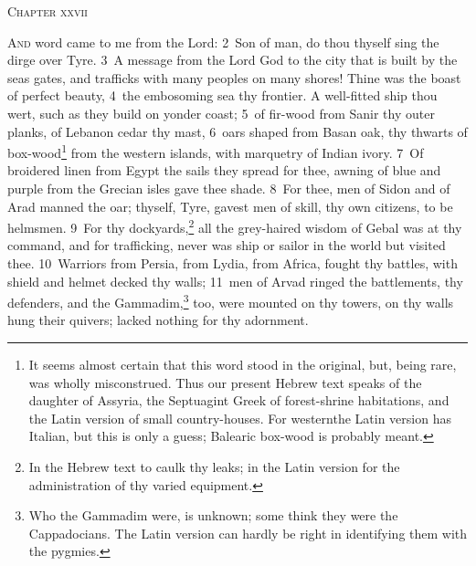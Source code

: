 \documentclass[10pt]{book} %
\begin{document}
\begin{large}\begin{center}\textsc{Chapter xxvii}\end{center}\end{large}
\lettrine[lines=2]{A}{nd} word came to me from the Lord: \textcolor{benred8}{2}~Son of man, do thou thyself sing the dirge over Tyre. \textcolor{benred8}{3}~A message from the Lord God to the city that is built by the sea\textquotesingle s gates, and trafficks with many peoples on many shores! Thine was the boast of perfect beauty, \textcolor{benred8}{4}~the embosoming sea thy frontier. A well-fitted ship thou wert, such as they build on yonder coast; \textcolor{benred8}{5}~of fir-wood from Sanir thy outer planks, of Lebanon cedar thy mast, \textcolor{benred8}{6}~oars shaped from Basan oak, thy thwarts of box-wood\footnote[1]{It seems almost certain that this word stood in the original, but, being rare, was wholly misconstrued. Thus our present Hebrew text speaks of \textasciigrave the daughter of Assyria\textquotesingle , the Septuagint Greek of \textasciigrave forest-shrine habitations\textquotesingle , and the Latin version of \textasciigrave small country-houses\textquotesingle . For \textasciigrave western\textquotesingle  the Latin version has \textasciigrave Italian\textquotesingle , but this is only a guess; Balearic box-wood is probably meant.} from the western islands, with marquetry of Indian ivory. \textcolor{benred8}{7}~Of broidered linen from Egypt the sails they spread for thee, awning of blue and purple from the Grecian isles gave thee shade.
\textcolor{benred8}{8}~For thee, men of Sidon and of Arad manned the oar; thyself, Tyre, gavest men of skill, thy own citizens, to be helmsmen. \textcolor{benred8}{9}~For thy dockyards,\footnote[2]{In the Hebrew text \textasciigrave to caulk thy leaks\textquotesingle ; in the Latin version \textasciigrave for the administration of thy varied equipment\textquotesingle .} all the grey-haired wisdom of Gebal was at thy command, and for trafficking, never was ship or sailor in the world but visited thee. \textcolor{benred8}{10}~Warriors from Persia, from Lydia, from Africa, fought thy battles, with shield and helmet decked thy walls; \textcolor{benred8}{11}~men of Arvad ringed the battlements, thy defenders, and the Gammadim,\footnote[3]{Who the Gammadim were, is unknown; some think they were the Cappadocians. The Latin version can hardly be right in identifying them with the pygmies.} too, were mounted on thy towers, on thy walls hung their quivers; lacked nothing for thy adornment.
\end{document}
